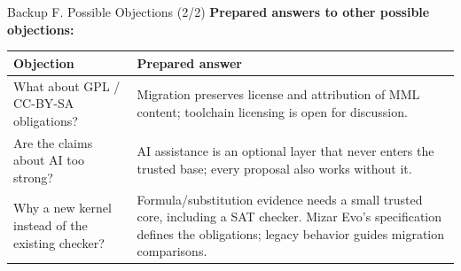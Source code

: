 \documentclass[aspectratio=169,11pt]{beamer}
\begin{document}
\begin{frame}[fragile,t]{Backup F. Possible Objections (2/2)}
\smallskip
\textbf{Prepared answers to other possible objections:}
\begin{footnotesize}
\setlength{\tabcolsep}{3pt}
\renewcommand{\arraystretch}{1.15}
\begin{tabularx}{\textwidth}{>{\raggedright\arraybackslash}X>{\raggedright\arraybackslash}X}
\toprule
\textbf{Objection} & \textbf{Prepared answer} \\
\midrule
What about GPL / CC-BY-SA obligations? & Migration preserves license and attribution of MML content; toolchain licensing is open for discussion. \\
Are the claims about AI too strong? & AI assistance is an optional layer that never enters the trusted base; every proposal also works without it. \\
Why a new kernel instead of the existing checker? & Formula/substitution evidence needs a small trusted core, including a SAT checker. Mizar Evo's specification defines the obligations; legacy behavior guides migration comparisons. \\
\bottomrule
\end{tabularx}
\end{footnotesize}

\end{frame}
\end{document}
